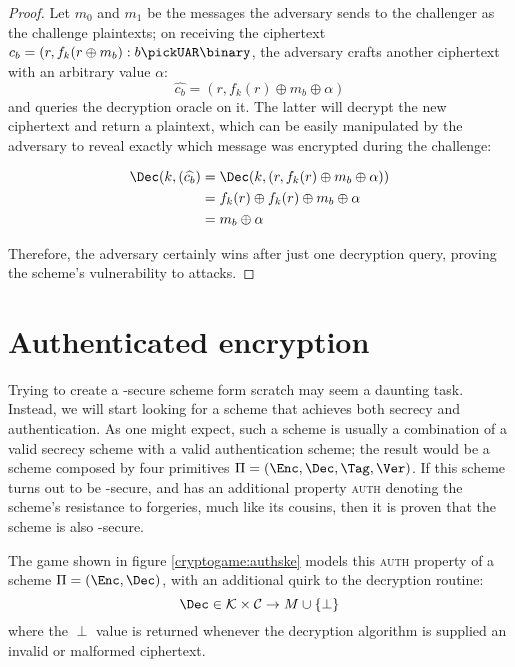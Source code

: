 \begin{proof}

    Let $m_0$ and $m_1$ be the messages the adversary sends to the challenger as the challenge plaintexts; on receiving the ciphertext $c_b = (r, f_k(r \oplus m_b) : b \pickUAR \binary$, the adversary crafts another ciphertext with an arbitrary value $\alpha$:
    \[
        \widehat{c_b} = (r, f_k(r) \oplus m_b \oplus \alpha)
    \]
    and queries the decryption oracle on it. The latter will decrypt the new ciphertext and return a plaintext, which can be easily manipulated by the adversary to reveal exactly which message was encrypted during the challenge:

    \begin{align*}
        \Dec(k, (\widehat{c_b}) &= \Dec(k, (r, f_k(r) \oplus m_b \oplus \alpha))    \\
                                &= f_k(r) \oplus f_k(r) \oplus m_b \oplus \alpha      \\
                                &= m_b \oplus \alpha                              \\
    \end{align*}

    Therefore, the adversary certainly wins after just one decryption query, proving the scheme's vulnerability to \cca{} attacks.
   
\end{proof}

\section{Authenticated encryption}

Trying to create a \cca-secure scheme form scratch may seem a daunting task. Instead, we will start looking for a scheme that achieves both secrecy and authentication. As one might expect, such a scheme is usually a combination of a valid secrecy scheme with a valid authentication scheme; the result would be a scheme composed by four primitives $\Pi = (\Enc, \Dec, \Tag, \Ver)$. If this scheme turns out to be \cpa-secure, and has an additional property \textsc{auth} denoting the scheme's resistance to forgeries, much like its \mac{} cousins, then it is proven that the scheme is also \cca-secure.

The game shown in figure \ref{cryptogame:authske} models this \textsc{auth} property of a scheme $\Pi = (\Enc, \Dec)$, with an additional quirk to the decryption routine:
\[
    \Dec \in \K \times \C \to M \cup \{\perp\}
\]
where the $\perp$ value is returned whenever the decryption algorithm is supplied an invalid or malformed ciphertext.

